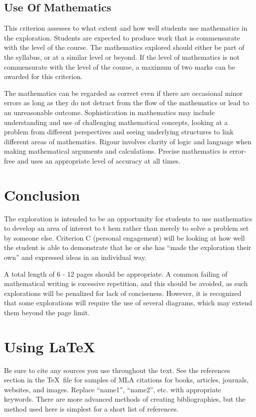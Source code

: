 \documentclass[11pt, letterpaper]{article}
\begin{document}
\subsection{Use Of Mathematics}
This criterion assesses to what extent and how well students use mathematics in the exploration. Students are
expected to produce work that is commensurate with the level of the course. The mathematics explored should either 
be part of the syllabus, or at a similar level or beyond. If the level of mathematics is not commensurate with the 
level of the course, a maximum of two marks can be awarded for this criterion.

The mathematics can be regarded as correct even if there are occasional minor errors as long as they do not detract
from the flow of the mathematics or lead to an unreasonable outcome. Sophistication in mathematics may include 
understanding and use of challenging mathematical concepts, looking at a problem from different perspectives and 
seeing underlying structures to link different areas of mathematics. Rigour involves clarity of logic and language 
when making mathematical arguments and calculations. Precise mathematics is error-free and uses an appropriate 
level of accuracy at all times.

\section{Conclusion}
The exploration is intended to be an opportunity for students to use mathematics to develop an area of interest to t
hem rather than merely to solve a problem set by someone else. Criterion C (personal engagement) will be looking at 
how well the student is able to demonstrate that he or she has “made the exploration their own” and expressed ideas 
in an individual way.

A total length of 6 - 12 pages should be appropriate. A common failing of mathematical writing is excessive 
repetition, and this should be avoided, as such explorations will be penalized for lack of conciseness. However, it 
is recognized that some explorations will require the use of several diagrams, which may extend them beyond the 
page limit.

\section{Using \LaTeX}
Be sure to cite any sources you use throughout the text. See the references section in the \TeX\, file for samples 
of MLA citations for books\cite{name1}, articles\cite{name2}, journals\cite{name3}, websites\cite{name4}, and 
images\cite{name5}. Replace ``name1'', ``name2'', etc. with appropriate keywords. There are more advanced methods 
of creating bibliographies, but the method used here is simplest for a short list of references.
\end{document}
